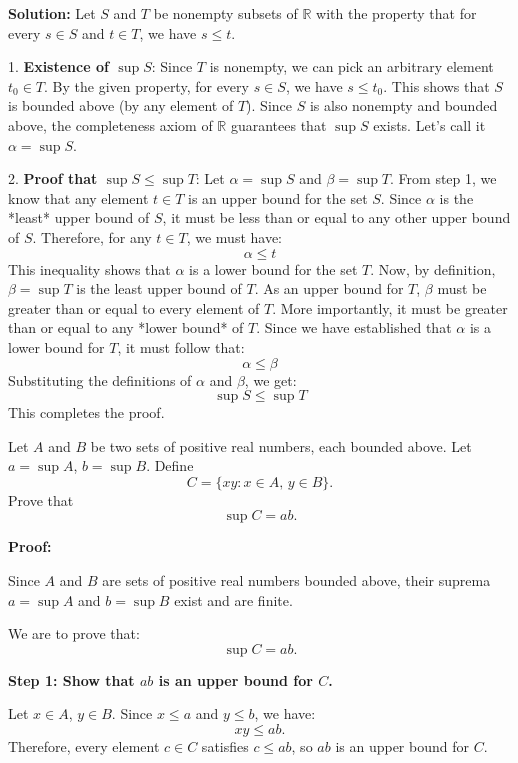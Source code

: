 \textbf{Solution:}
Let $S$ and $T$ be nonempty subsets of $\mathbb{R}$ with the property that for every $s \in S$ and $t \in T$, we have $s \leq t$.

1.  \textbf{Existence of $\sup S$}:
Since $T$ is nonempty, we can pick an arbitrary element $t_0 \in T$. By the given property, for every $s \in S$, we have $s \leq t_0$. This shows that $S$ is bounded above (by any element of $T$). Since $S$ is also nonempty and bounded above, the completeness axiom of $\mathbb{R}$ guarantees that $\sup S$ exists. Let's call it $\alpha = \sup S$.

2.  \textbf{Proof that $\sup S \leq \sup T$}:
Let $\alpha = \sup S$ and $\beta = \sup T$.
From step 1, we know that any element $t \in T$ is an upper bound for the set $S$.
Since $\alpha$ is the *least* upper bound of $S$, it must be less than or equal to any other upper bound of $S$. Therefore, for any $t \in T$, we must have:
\[
\alpha \leq t
\]
This inequality shows that $\alpha$ is a lower bound for the set $T$.
Now, by definition, $\beta = \sup T$ is the least upper bound of $T$. As an upper bound for $T$, $\beta$ must be greater than or equal to every element of $T$. More importantly, it must be greater than or equal to any *lower bound* of $T$.
Since we have established that $\alpha$ is a lower bound for $T$, it must follow that:
\[
\alpha \leq \beta
\]
Substituting the definitions of $\alpha$ and $\beta$, we get:
\[
\sup S \leq \sup T
\]
This completes the proof.

\begin{problembox}
Let \( A \) and \( B \) be two sets of positive real numbers, each bounded above. Let \( a = \sup A \), \( b = \sup B \). Define
\[
C = \{ xy : x \in A,\, y \in B \}.
\]
Prove that
\[
\sup C = ab.
\]
\end{problembox}

\textbf{Proof:}

Since \( A \) and \( B \) are sets of positive real numbers bounded above, their suprema \( a = \sup A \) and \( b = \sup B \) exist and are finite.

We are to prove that:
\[
\sup C = ab.
\]

\textbf{Step 1: Show that \( ab \) is an upper bound for \( C \).}

Let \( x \in A \), \( y \in B \). Since \( x \leq a \) and \( y \leq b \), we have:
\[
xy \leq ab.
\]
Therefore, every element \( c \in C \) satisfies \( c \leq ab \), so \( ab \) is an upper bound for \( C \).

